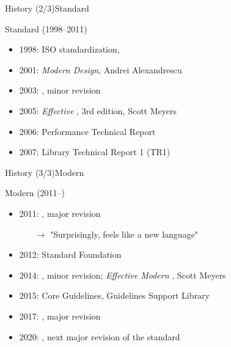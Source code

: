 \begin{frame}{\CCLang History (2/3)}{Standard \CCLang}
  \begin{block}{Standard \CCLang (1998--2011)}
    \begin{itemize}
    \item
      1998: ISO standardization, 
    \item
      2001: \emph{Modern \CCLang Design}, Andrei Alexandrescu
    \item
      2003: , minor revision
    \item
      2005: \emph{Effective \CCLang}, 3rd edition, Scott Meyers
    \item
      2006: Performance Technical Report
    \item
      2007: Library Technical Report 1 (TR1)
    \end{itemize}
  \end{block}
\end{frame}

\begin{frame}{\CCLang History (3/3)}{Modern \CCLang}
  \begin{block}{Modern \CCLang (2011--)}
    \begin{itemize}
    \item
      2011: , major revision
      \begin{itemize}
      \item[$\to$]
        "Surprisingly,  feels like a new language"
      \end{itemize}
    \item
      2012: Standard \CCLang Foundation
    \item
      2014: , minor revision; \emph{Effective Modern \CCLang}, Scott Meyers
    \item
      2015: \CCLang Core Guidelines, Guidelines Support Library
    \item
      2017: , major revision
    \item
      2020: , next major revision of the standard
    \end{itemize}
  \end{block}
\end{frame}

